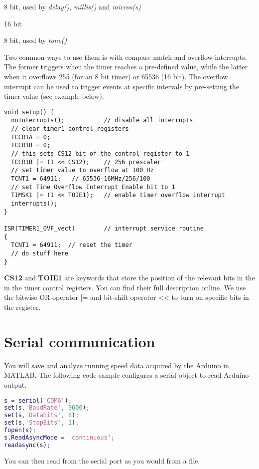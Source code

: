 \documentclass[a4paper,10pt]{article}
\begin{document}
\begin{description}[align=right]
\item [Timer0] 8 bit, used by \textit{delay()}, \textit{millis()} and \textit{micros(s)}
\item [Timer1] 16 bit
\item [Timer2] 8 bit, used by \textit{tone()}
\end{description}

Two common ways to 
use them is with compare match and overflow interrupts. The former triggers when the timer
reaches a pre-defined value, while the latter when it overflows 255 (for an 8 bit timer) or 
65536 (16 bit). The overflow interrupt can be used to trigger events at specific intervals
by pre-setting the timer value (see example below).

\begin{lstlisting}
void setup() {
  noInterrupts();           // disable all interrupts
  // clear timer1 control registers
  TCCR1A = 0;
  TCCR1B = 0;
  // this sets CS12 bit of the control register to 1
  TCCR1B |= (1 << CS12);    // 256 prescaler 
  // set timer value to overflow at 100 Hz
  TCNT1 = 64911;   // 65536-16MHz/256/100
  // set Time Overflow Interrupt Enable bit to 1
  TIMSK1 |= (1 << TOIE1);   // enable timer overflow interrupt
  interrupts();  
}

ISR(TIMER1_OVF_vect)        // interrupt service routine 
{
  TCNT1 = 64911;  // reset the timer
  // do stuff here
}
\end{lstlisting}

\textbf{CS12} and \textbf{TOIE1} are keywords that store the position of the relevant bits in the 
in the timer control registers. You can find their full description online. We use 
the bitwise OR operator |= and bit-shift operator << to turn on specific bits in 
the register.

\section{Serial communication}
You will save and analyze running speed data acquired by the Arduino in MATLAB.
The following code sample configures a serial object to read Arduino
output.

\begin{lstlisting}[language=matlab]
 % initialize serial communication
s = serial('COM6');
set(s,'BaudRate', 9600);
set(s,'DataBits', 8);
set(s,'StopBits', 1);
fopen(s);
s.ReadAsyncMode = 'continuous';
readasync(s);
\end{lstlisting}

You can then read from the serial port as you would from a file.
\end{document}

